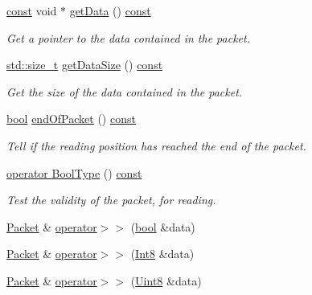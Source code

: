 \begin{DoxyCompactItemize}
\hyperlink{term__entry_8h_a57bd63ce7f9a353488880e3de6692d5a}{const} void $\ast$ \hyperlink{classsf_1_1_packet_a304ba9ec94c992710f4dfff879c6340e}{get\-Data} () \hyperlink{term__entry_8h_a57bd63ce7f9a353488880e3de6692d5a}{const} 
\begin{DoxyCompactList}\small\item\em Get a pointer to the data contained in the packet. \end{DoxyCompactList}\item 
\hyperlink{nc__alloc_8h_a7b60c5629e55e8ec87a4547dd4abced4}{std\-::size\-\_\-t} \hyperlink{classsf_1_1_packet_a004b62aa5bafa69df8917171a3fe1fa0}{get\-Data\-Size} () \hyperlink{term__entry_8h_a57bd63ce7f9a353488880e3de6692d5a}{const} 
\begin{DoxyCompactList}\small\item\em Get the size of the data contained in the packet. \end{DoxyCompactList}\item 
\hyperlink{term__entry_8h_a002004ba5d663f149f6c38064926abac}{bool} \hyperlink{classsf_1_1_packet_aee3adfca6303f1e6bde3c62be392b945}{end\-Of\-Packet} () \hyperlink{term__entry_8h_a57bd63ce7f9a353488880e3de6692d5a}{const} 
\begin{DoxyCompactList}\small\item\em Tell if the reading position has reached the end of the packet. \end{DoxyCompactList}\item 
\hyperlink{classsf_1_1_packet_addcb990cde37859c748273d9de55e628}{operator Bool\-Type} () \hyperlink{term__entry_8h_a57bd63ce7f9a353488880e3de6692d5a}{const} 
\begin{DoxyCompactList}\small\item\em Test the validity of the packet, for reading. \end{DoxyCompactList}\item 
\hyperlink{classsf_1_1_packet}{Packet} \& \hyperlink{classsf_1_1_packet_af8e26c63ba9bdccd262565ff0d3eeba2}{operator$>$$>$} (\hyperlink{term__entry_8h_a002004ba5d663f149f6c38064926abac}{bool} \&data)
\item 
\hyperlink{classsf_1_1_packet}{Packet} \& \hyperlink{classsf_1_1_packet_a70fd5abb9095b5335b79c0cefd17b222}{operator$>$$>$} (\hyperlink{namespacesf_a69b109973eac74e22b97e5339bdb68dd}{Int8} \&data)
\item 
\hyperlink{classsf_1_1_packet}{Packet} \& \hyperlink{classsf_1_1_packet_aa67738284a7efc16c7594b358ef35510}{operator$>$$>$} (\hyperlink{namespacesf_a4ef3d630785c4f296f9b4f274c33d78e}{Uint8} \&data)

\end{DoxyCompactItemize}
